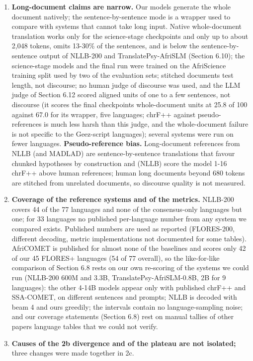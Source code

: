 \begin{enumerate}
\item
  \textbf{Long-document claims are narrow.} Our models generate the whole document natively; the sentence-by-sentence mode is a wrapper used to compare with systems that cannot take long input. Native whole-document translation works only for the science-stage checkpoints and only up to about 2,048 tokens, omits 13-30\% of the sentences, and is below the sentence-by-sentence output of NLLB-200 and TranslatePsy-AfriSLM (Section 6.10); the science-stage models and the final run were trained on the AfriScience training split used by two of the evaluation sets; stitched documents test length, not discourse; no human judge of discourse was used, and the LLM judge of Section 6.12 scored aligned units of one to a few sentences, not discourse (it scores the final checkpoint\textquotesingle s whole-document units at 25.8 of 100 against 67.0 for its wrapper, five languages; chrF++ against pseudo-references is much less harsh than this judge, and the whole-document failure is not specific to the Ge\textquotesingle ez-script languages); several systems were run on fewer languages. \textbf{Pseudo-reference bias.} Long-document references from NLLB (and MADLAD) are sentence-by-sentence translations that favour chunked hypotheses by construction and (NLLB) score the model 1-16 chrF++ above human references; human long documents beyond 680 tokens are stitched from unrelated documents, so discourse quality is not measured.
\item
  \textbf{Coverage of the reference systems and of the metrics.} NLLB-200 covers 44 of the 77 languages and none of the consensus-only languages but one; for 33 languages no published per-language number from any system we compared exists. Published numbers are used as reported (FLORES-200, different decoding, metric implementations not documented for some tables). AfriCOMET is published for almost none of the baselines and scores only 42 of our 45 FLORES+ languages (54 of 77 overall), so the like-for-like comparison of Section 6.8 rests on our own re-scoring of the systems we could run (NLLB-200 600M and 3.3B, TranslatePsy-AfriSLM-0.8B, 2B for 9 languages): the other 4-14B models appear only with published chrF++ and SSA-COMET, on different sentences and prompts; NLLB is decoded with beam 4 and ours greedily; the intervals contain no language-sampling noise; and our coverage statements (Section 6.8) rest on manual tallies of other papers\textquotesingle{} language tables that we could not verify.
\item
  \textbf{Causes of the 2b divergence and of the plateau are not isolated;} three changes were made together in 2c.

\end{enumerate}
